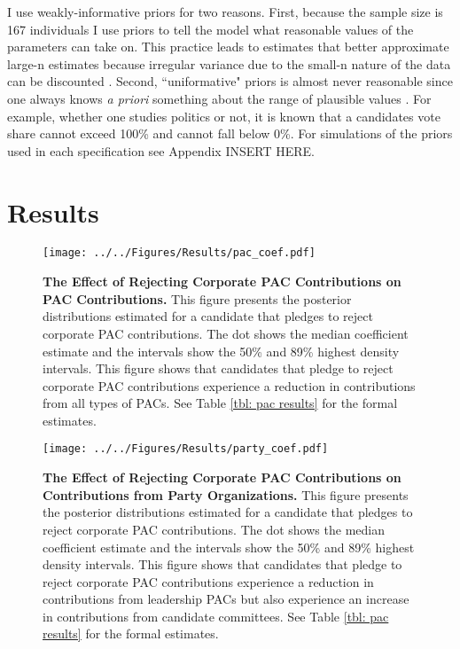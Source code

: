 \documentclass[12pt]{article}
\begin{document}
I use weakly-informative priors for two reasons. First, because the sample size is 167 individuals I use priors to tell the model what reasonable values of the parameters can take on. This practice leads to estimates that better approximate large-n estimates because irregular variance due to the small-n nature of the data can be discounted \citep{mcneish_using_2016}. Second, ``uniformative" priors is almost never reasonable since one always knows \textit{a priori} something about the range of plausible values \citep{gelman_weakly_2008}. For example, whether one studies politics or not, it is known that a candidates vote share cannot exceed 100\% and cannot fall below 0\%. For simulations of the priors used in each specification see Appendix INSERT HERE.


\section{Results}

\begin{figure}[ht]
	\centering
	\texttt{[image: ../../Figures/Results/pac\_coef.pdf]}
	\caption{\textbf{The Effect of Rejecting Corporate PAC Contributions on PAC Contributions.} This figure presents the posterior distributions estimated for a candidate that pledges to reject corporate PAC contributions. The dot shows the median coefficient estimate and the intervals show the 50\% and 89\% highest density intervals. This figure shows that candidates that pledge to reject corporate PAC contributions experience a reduction in contributions from all types of PACs. See Table \ref{tbl: pac results} for the formal estimates.}
	\label{fig: pac results}
\end{figure}

\begin{figure}[ht]
	\centering
	\texttt{[image: ../../Figures/Results/party\_coef.pdf]}
	\caption{\textbf{The Effect of Rejecting Corporate PAC Contributions on Contributions from Party Organizations.} This figure presents the posterior distributions estimated for a candidate that pledges to reject corporate PAC contributions. The dot shows the median coefficient estimate and the intervals show the 50\% and 89\% highest density intervals. This figure shows that candidates that pledge to reject corporate PAC contributions experience a reduction in contributions from leadership PACs but also experience an increase in contributions from candidate committees. See Table \ref{tbl: pac results} for the formal estimates.}
	\label{fig: party results}
\end{figure}
\end{document}

